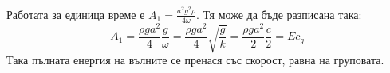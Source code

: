 Работата за единица време е $A_1 = \frac{a^2 g^2 \rho}{4 \omega}$. Тя може да бъде разписана така:
\begin{equation}
	A_1 = \frac{\rho g a^2}{4}\frac{g}{\omega} = \frac{\rho g a^2}{4}\sqrt{\frac{g}{k}}=\frac{\rho g a^2}{2}\frac{c}{2} = E c_g
\end{equation}
Така пълната енергия на вълните се пренася със скорост, равна на груповата.